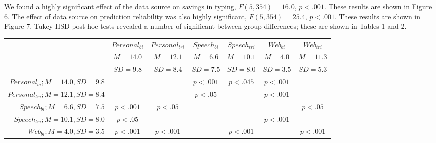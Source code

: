 \documentclass{sigchi}
\begin{document}
We found a highly significant effect of the data source on savings in typing, $F(5,354)=16.0$, $p<.001$. These results are shown in Figure 6. The effect of data source on prediction reliability was also highly significant, $F(5,354)=25.4$,
$p<.001$. These results are shown in Figure 7. Tukey HSD post-hoc tests revealed a number of significant between-group differences; these are shown in Tables 1 and 2.

\begingroup
\everymath{\scriptstyle}
\tiny

\begin{table}
    \centering
    \begin{tabular}{|r|c|c|c|c|c|c|}
    \hline
    ~ & $Personal_{bi}$ & $Personal_{tri}$ & $Speech_{bi}$ & $Speech_{tri}$ & $Web_{bi}$ & $Web_{tri}$ \\
    ~ & $M=14.0$ & $M=12.1$ & $M=6.6$  & $M=10.1$ & $M=4.0$  & $M=11.3$ \\ 
    ~ & $SD=9.8$ & $SD=8.4$ & $SD=7.5$ & $SD=8.0$ & $SD=3.5$ & $SD=5.3$ \\ \hline
    $Personal_{bi};M=14.0,SD=9.8$  & ~                                            & ~                                             & $p<.001$                                  & $p<.045$                                    & $p<.001$                               & ~                                        \\ \hline
    $Personal_{tri};M=12.1,SD=8.4$ & ~                                            & ~                                             & $p<.05$                                   & ~                                           & $p<.001$                               & ~                                        \\ \hline
    $Speech_{bi};M=6.6,SD=7.5$     & $p<.001$                                     & $p<.05$                                       & ~                                         & ~                                           & ~                                      & $p<.05$                                  \\ \hline
    $Speech_{tri};M=10.1,SD=8.0$   & $p<.05$                                      & ~                                             & ~                                         & ~                                           & $p<.001$                               & ~                                        \\ \hline
    $Web_{bi};M=4.0,SD=3.5$        & $p<.001$                                     & $p<.001$                                      & ~                                         & $p<.001$                                    & ~                                      & $p<.001$                                 \\ \hline

\end{tabular}
\end{table}
\end{document}
